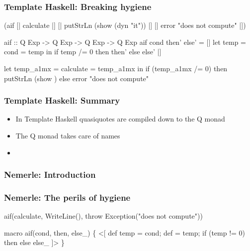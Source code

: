 \documentclass[hyperref={bookmarks=false}]{beamer}
\begin{document}
\begin{frame}[fragile]
\frametitle{Template Haskell: Breaking hygiene}
\begin{semiverbatim}
{\textdollar}(aif [| calculate |]
  [| putStrLn (show \alert{{\textdollar}(dyn "it")}) |]
  [| error "does not compute" |])

aif :: Q Exp -> Q Exp -> Q Exp -> Q Exp
aif cond then' else' =
  [| let temp = {\textdollar}cond
         \text{\color{red}{it}} = temp
     in if temp /= 0 then {\textdollar}then' else {\textdollar}else' |]

let temp_a1mx = calculate
    \text{\color{red}{it_a1my}} = temp_a1mx
in if (temp_a1mx /= 0)
   then putStrLn (show \text{\color{blue}{it_a1my}})
   else error "does not compute"
\end{semiverbatim}
\end{frame}

\begin{frame}[fragile]
\frametitle{Template Haskell: Summary}
\begin{itemize}
\item In Template Haskell quasiquotes are compiled down to the Q monad
\item The Q monad takes care of names
\item \text{\color{blue}{Sometimes we need to break hygiene}}
\end{itemize}
\end{frame}

\begin{frame}[fragile]
\frametitle<1>{Nemerle: Introduction}
\frametitle<2>{Nemerle: The perils of hygiene}
\begin{semiverbatim}
aif(calculate,
  WriteLine(),
  throw Exception("does not compute"))

macro aif(cond, then, else_) \{
  <[
    def temp = {\textdollar}cond;
    def  = temp;
    if (temp != 0) {\textdollar}then else {\textdollar}else_
  ]>
\}
\end{semiverbatim}

\end{frame}
\end{document}
